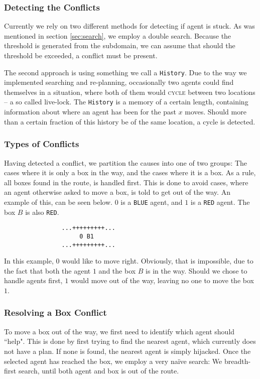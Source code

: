 \documentclass[letterpaper]{article}
\begin{document}
		\subsubsection{Detecting the Conflicts}
			Currently we rely on two different methods for detecting if agent is stuck. As was mentioned in section \ref{sec:search}, we employ a double search. Because the threshold is generated from the subdomain, we can assume that should the threshold be exceeded, a conflict must be present.

			The second approach is using something we call a \verb=History=. Due to the way we implemented searching and re-planning, occasionally two agents could find themselves in a situation, where both of them would \textsc{cycle} between two locations -- a so called live-lock. The \verb=History= is a memory of a certain length, containing information about where an agent has been for the past $x$ moves. Should more than a certain fraction of this history be of the same location, a cycle is detected.

		\subsubsection{Types of Conflicts}
			Having detected a conflict, we partition the causes into one of two groups: The cases where it is only a box in the way, and the cases where it is a box. As a rule, all boxes found in the route, is handled first. This is done to avoid cases, where an agent otherwise asked to move a box, is told to get out of the way. An example of this, can be seen below. $0$ is a \verb=BLUE= agent, and $1$ is a \verb=RED= agent. The box $B$ is also \verb=RED=. 
			\begin{verbatim}
				...+++++++++...
				     0 B1
				...+++++++++...
			\end{verbatim}
			In this example, $0$ would like to move right. Obviously, that is impossible, due to the fact that both the agent $1$ and the box $B$ is in the way. Should we chose to handle agents first, $1$ would move out of the way, leaving no one to move the box $1$.

		\subsubsection{Resolving a Box Conflict}
			To move a box out of the way, we first need to identify which agent should ``help". This is done by first trying to find the nearest agent, which currently does not have a plan. If none is found, the nearest agent is simply hijacked. Once the selected agent has reached the box, we employ a very naïve search: We breadth-first search, until both agent and box is out of the route.
\end{document}
